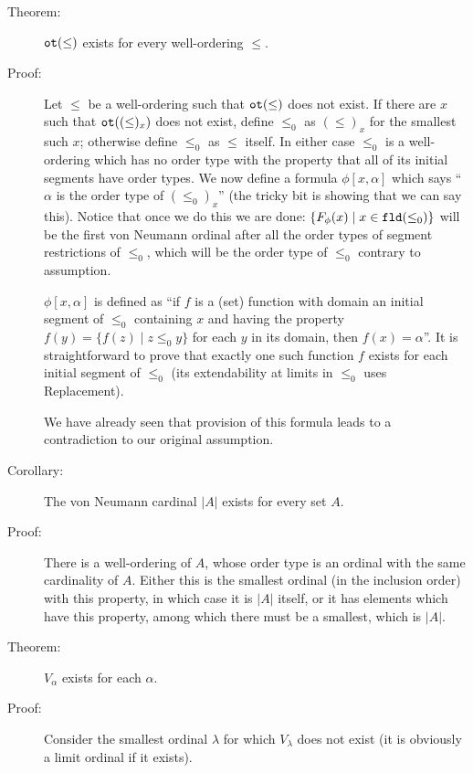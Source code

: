 \documentclass[12pt]{book}
\begin{document}
\begin{description}

\item[Theorem:] ${\tt ot}(\leq)$ exists for every well-ordering $\leq$.

\item[Proof:] Let $\leq$ be a well-ordering such that ${\tt ot}(\leq)$
does not exist.  If there are $x$ such that ${\tt ot}((\leq)_x)$ does
not exist, define $\leq_0$ as $(\leq)_x$ for the smallest such $x$;
otherwise define $\leq_0$ as $\leq$ itself.  In either case $\leq_0$
is a well-ordering which has no order type with the property that all
of its initial segments have order types.  We now define a formula
$\phi[x,\alpha]$ which says ``$\alpha$ is the order type of
$(\leq_0)_x$'' (the tricky bit is showing that we can say this).
Notice that once we do this we are done: $\{F_{\phi}(x) \mid x \in
{\tt fld}(\leq_0)\}$ will be the first von Neumann ordinal after all
the order types of segment restrictions of $\leq_0$, which will be the
order type of $\leq_0$ contrary to assumption.

$\phi[x,\alpha]$ is defined as ``if $f$ is a (set) function with
domain an initial segment of $\leq_0$ containing $x$ and having the
property $f(y) = \{f(z) \mid z \leq_0 y\}$ for each $y$ in its domain,
then $f(x) = \alpha$''.  It is straightforward to prove that exactly
one such function $f$ exists for each initial segment of $\leq_0$ (its
extendability at limits in $\leq_0$ uses Replacement).

We have already seen that provision of this formula leads to a
contradiction to our original assumption.

\item[Corollary:]  The von Neumann cardinal $|A|$ exists for every set $A$.

\item[Proof:] There is a well-ordering of $A$, whose order type is an
ordinal with the same cardinality of $A$.  Either this is the smallest
ordinal (in the inclusion order) with this property, in which case it
is $|A|$ itself, or it has elements which have this property, among
which there must be a smallest, which is $|A|$.

\item[Theorem:]  $V_{\alpha}$ exists for each $\alpha$.

\item[Proof:] Consider the smallest ordinal $\lambda$ for which
$V_{\lambda}$ does not exist (it is obviously a limit ordinal if it
exists).


\end{description}
\end{document}
